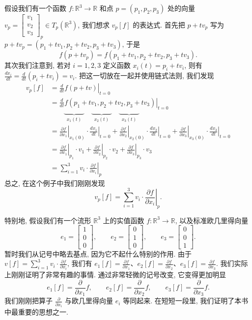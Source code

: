 假设我们有一个函数 $f:\mathbb{R}^3\to\mathbb{R}$ 和点 $p=(p_1,p_2,p_3)$ 处的向量 $v_p=\begin{bmatrix}v_1\\v_2\\v_3\end{bmatrix}_p\in T_p(\mathbb{R}^3)$, 我们想求 $v_p[f]$ 的表达式. 首先把 $p+tv_p$ 写为 $p+tv_p=(p_1+tv_1,p_2+tv_2,p_3+tv_3)$, 于是
\[
f(p+tv_p)=f(p_1+tv_1,p_2+tv_2,p_3+tv_3).
\]
其次我们注意到, 若对 $i=1,2,3$ 定义函数 $x_i(t)=p_i+tv_i$, 则有 $\frac{dx_i}{dt}=\frac{d}{dt}(p_i+tv_i)=v_i$. 把这一切放在一起并使用链式法则, 我们发现
\begin{align*}
v_p[f]&=\left.\frac{d}{dt}f(p+tv)\right|_{t=0}\\
&=\left.\frac{d}{dt}f(p_1+tv_1,p_2+tv_2,p_3+tv_3)\right|_{t=0}\\
&\qquad\underbrace{\qquad\quad}_{x_1(t)}\quad\underbrace{\qquad\quad}_{x_2(t)}\quad\underbrace{\qquad\quad}_{x_3(t)}\\
&=\left.\frac{\partial f}{\partial x_1}\right|_{x_1(0)}\cdot\left.\frac{dx_1}{dt}\right|_{t=0}
+\left.\frac{\partial f}{\partial x_2}\right|_{x_2(0)}\cdot\left.\frac{dx_2}{dt}\right|_{t=0}
+\left.\frac{\partial f}{\partial x_3}\right|_{x_3(0)}\cdot\left.\frac{dx_3}{dt}\right|_{t=0}\\
&=\left.\frac{\partial f}{\partial x_1}\right|_{p_1}\cdot v_1+\left.\frac{\partial f}{\partial x_2}\right|_{p_2}\cdot v_2+\left.\frac{\partial f}{\partial x_3}\right|_{p_3}\cdot v_3\\
&=\sum_{i=1}^{3}v_i\cdot\left.\frac{\partial f}{\partial x_i}\right|_{p}
\end{align*}
总之, 在这个例子中我们刚刚发现
\[
v_p[f]=\sum_{i=1}^{3}v_i\cdot\left.\frac{\partial f}{\partial x_i}\right|_{p}.
\]

特别地, 假设我们有一个流形 $\mathbb{R}^3$ 上的实值函数 $f:\mathbb{R}^3\to\mathbb{R}$, 以及标准欧几里得向量
\[
e_1=\begin{bmatrix}1\\0\\0\end{bmatrix},\qquad e_2=\begin{bmatrix}0\\1\\0\end{bmatrix},\qquad e_3=\begin{bmatrix}0\\0\\1\end{bmatrix}.
\]
暂时我们从记号中略去基点, 因为它不起什么特别的作用. 由于 $v[f]=\sum_{i=1}^{3}v_i\cdot\frac{\partial f}{\partial x_i}$, 我们有 $e_1[f]=\frac{\partial f}{\partial x_1}$、$e_2[f]=\frac{\partial f}{\partial x_2}$、$e_3[f]=\frac{\partial f}{\partial x_3}$. 我们实际上刚刚证明了非常有趣的事情. 通过非常轻微的记号改变, 它变得更加明显
\[
e_1[f]=\frac{\partial}{\partial x_1}f,\qquad e_2[f]=\frac{\partial}{\partial x_2}f,\qquad e_3[f]=\frac{\partial}{\partial x_3}f.
\]
我们刚刚把算子 $\frac{\partial}{\partial x_i}$ 与欧几里得向量 $e_i$ 等同起来. 在短短一段里, 我们证明了本书中最重要的思想之一.

